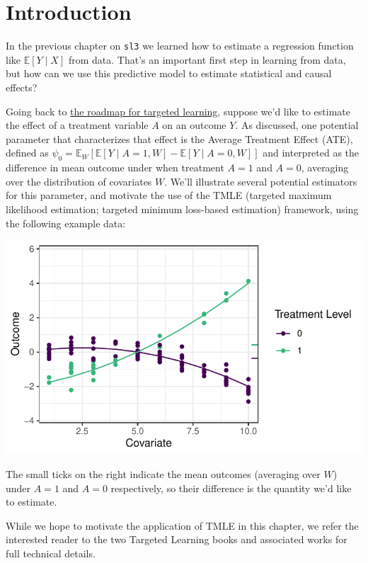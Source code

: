 \documentclass[12pt, krantz2,]{book}
\theoremstyle{definition}
\theoremstyle{definition}
\theoremstyle{definition}
\newcommand{\1}{\mathbbm{1}}
\begin{document}
\hypertarget{tmle-intro}{%
\section{Introduction}\label{tmle-intro}}

In the previous chapter on \texttt{sl3} we learned how to estimate a regression
function like \(\mathbb{E}[Y \mid X]\) from data. That's an important first step
in learning from data, but how can we use this predictive model to estimate
statistical and causal effects?

Going back to \protect\hyperlink{intro}{the roadmap for targeted learning}, suppose we'd like to
estimate the effect of a treatment variable \(A\) on an outcome \(Y\). As discussed,
one potential parameter that characterizes that effect is the Average Treatment
Effect (ATE), defined as \(\psi_0 = \mathbb{E}_W[\mathbb{E}[Y \mid A=1,W] - \mathbb{E}[Y \mid A=0,W]]\) and interpreted as the difference in mean outcome
under when treatment \(A=1\) and \(A=0\), averaging over the distribution of
covariates \(W\). We'll illustrate several potential estimators for this
parameter, and motivate the use of the TMLE (targeted maximum likelihood
estimation; targeted minimum loss-based estimation) framework, using the
following example data:

\begin{center}\includegraphics[width=0.8\linewidth]{img/misc/tmle_sim/schematic_1_truedgd} \end{center}

The small ticks on the right indicate the mean outcomes (averaging over \(W\))
under \(A=1\) and \(A=0\) respectively, so their difference is the quantity we'd
like to estimate.

While we hope to motivate the application of TMLE in this chapter, we refer the
interested reader to the two Targeted Learning books and associated works for
full technical details.
\end{document}
